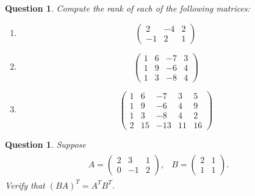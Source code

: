\documentclass[12pt]{article}
\newtheorem{ques}[theorem]{Question}
\begin{document}
\newpage
\begin{ques}
Compute the rank of each of the following matrices:
\begin{enumerate}
    \item \[\begin{pmatrix} 2 & -4 & 2\\-1& 2& 1\end{pmatrix}
    \]
    \item \[\begin{pmatrix} 1 & 6 & -7 & 3\\ 1& 9 & -6 &4
    \\ 1& 3& -8 & 4\end{pmatrix}
    \]
    \item \[\begin{pmatrix} 1 & 6 & -7 & 3 &5\\ 1& 9 & -6 &4&9
    \\ 1& 3& -8 & 4& 2\\ 2&15&-13 &11 & 16 \end{pmatrix}
    \]
\end{enumerate}
\end{ques}

\newpage
\begin{ques}
Suppose 
\begin{align*}
    \begin{array}{cc}
     A=\begin{pmatrix} 2 & 3& 1\\ 0 & -1 & 2 
         \end{pmatrix},    &  B=\begin{pmatrix} 2& 1\\ 1& 1\end{pmatrix}.
    \end{array}
\end{align*}
Verify that $(BA)^T=A^TB^T$.
\end{ques}
\end{document}
